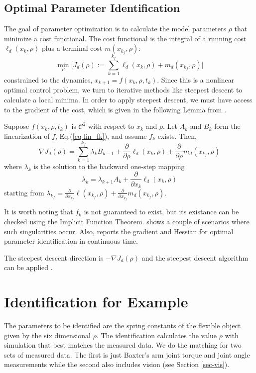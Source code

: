 \documentclass[runningheads,a4paper]{llncs}
\begin{document}
\subsection{Optimal Parameter Identification \label{sec-opt}}
The goal of parameter optimization is to calculate the model parameters $\rho$ that minimize a cost functional.  The cost functional is the integral of a running cost $\ell_d(x_k,\rho)$ plus a terminal cost $m(x_{k_f},\rho)$:
\[
\min_{\rho} \Big[J_d(\rho):=\sum_{k=1}^{k_f}\ell_d(x_k,\rho) + m_d(x_{k_f},\rho)\Big]
\]
constrained to the dynamics, $x_{k+1} = f(x_k,\rho,t_k)$. Since this is a nonlinear optimal control problem, we turn to iterative methods like steepest descent to calculate a local minima. In order to apply steepest descent, we must have access to the gradient of the cost, which is given in the following Lemma from \cite{caldwell_coleman_correll_iros}. 
\begin{lemma}
\label{lem-grad_a}
Suppose $f(x_k,\rho,t_k)$ is $\mathcal{C}^2$ with respect to $x_k$ and $\rho$.  Let $A_k$ and $B_k$ form the linearization of $f$, Eq.(\ref{eq-lin_fk}), and assume $f_k$ exists.  Then,
\begin{equation}
\nabla J_d(\rho) = \sum_{k = 1}^{k_f}\lambda_kB_{k-1} +\frac{\partial}{\partial \rho}\ell_d(x_k,\rho) + \frac{\partial}{\partial \rho}m_d(x_{k_f},\rho)
\label{eq-DJa}
\end{equation}
where $\lambda_k$ is the solution to the backward one-step mapping
\begin{equation}
\lambda_k = \lambda_{k+1}A_{k} + \frac{\partial}{\partial x_{k}}\ell_d(x_{k},\rho) 
\label{eq-lambda}
\end{equation}
starting from $\lambda_{k_f} = \frac{\partial}{\partial x_{k_f}}\ell(x_{k_f},\rho) + \frac{\partial}{\partial x_{k_f}}m_d(x_{k_f},\rho)$.  
\end{lemma}

It is worth noting that $f_k$ is not guaranteed to exist, but its existance can be checked using the Implicit Function Theorem. \cite{johnson_schultz_murphey} shows a couple of scenarios where such singularities occur.  Also, \cite{miller_murphey} reports the gradient and Hessian for optimal parameter identification in continuous time.

The steepest descent direction is $-\nabla J_d(\rho)$ and the steepest descent algorithm can be applied \cite{kelley}.

\section{Identification for Example}
\label{sec-id_eg}
The parameters to be identified are the spring constants of the flexible object given by the six dimensional $\rho$.  The identification calculates the value $\rho$ with simulation that best matches the measured data. We do the matching for two sets of measured data.  The first is just Baxter's arm joint torque and joint angle measurements while the second also includes vision (see Section \ref{sec-vis}).  
\end{document}
